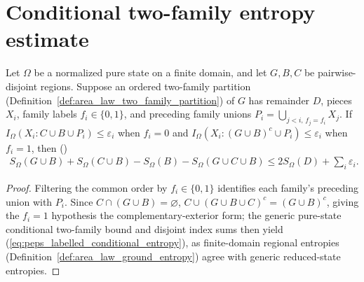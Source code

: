 \section{Conditional two-family entropy estimate}

\begin{lemma}
    \label{thm:peps_labelled_conditional_entropy}
    \leanok
    Let $\Omega$ be a normalized pure state on a finite domain, and let $G,B,C$
    be pairwise-disjoint regions. Suppose an ordered two-family partition
    (Definition~\ref{def:area_law_two_family_partition}) of $G$ has remainder $D$,
    pieces $X_i$, family labels $f_i\in\{0,1\}$, and preceding family unions
    $P_i=\bigcup_{j<i,\,f_j=f_i}X_j$.
    If $I_\Omega(X_i:C\cup B\cup P_i)\le\varepsilon_i$ when $f_i=0$ and
    $I_\Omega(X_i:(G\cup B)^c\cup P_i)\le\varepsilon_i$ when $f_i=1$, then
    (\cite[Lemma~3.2]{OpenAI2026PolynomialPEPS})
    \begin{align}
        S_\Omega(G\cup B)+S_\Omega(C\cup B)-S_\Omega(B)-S_\Omega(G\cup C\cup B)
        \le 2S_\Omega(D)+\sum_i\varepsilon_i.
        \label{eq:peps_labelled_conditional_entropy}
    \end{align}
\end{lemma}
\begin{proof}\leanok
    Filtering the common order by $f_i\in\{0,1\}$ identifies each family's
    preceding union with $P_i$. Since $C\cap(G\cup B)=\varnothing$,
    $C\cup(G\cup B\cup C)^c=(G\cup B)^c$, giving the $f_i=1$ hypothesis
    the complementary-exterior form; the generic pure-state
    conditional two-family bound and disjoint index sums then yield
    (\ref{eq:peps_labelled_conditional_entropy}), as finite-domain regional entropies
    (Definition~\ref{def:area_law_ground_entropy}) agree with generic reduced-state entropies.
\end{proof}

